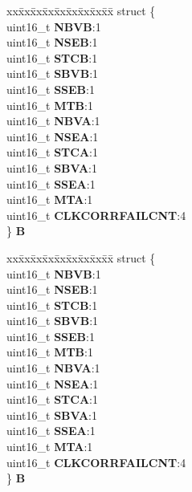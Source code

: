 \begin{DoxyCompactItemize}
\begin{tabbing}
\end{tabbing}\item 
\mbox{\label{unionuPSR2_adf903220107e8ba7a5a6f409ef2f9567}} 
\begin{tabbing}
xx\=xx\=xx\=xx\=xx\=xx\=xx\=xx\=xx\=\kill
struct \{\\
\>uint16\_t {\bfseries NBVB}:1\\
\>uint16\_t {\bfseries NSEB}:1\\
\>uint16\_t {\bfseries STCB}:1\\
\>uint16\_t {\bfseries SBVB}:1\\
\>uint16\_t {\bfseries SSEB}:1\\
\>uint16\_t {\bfseries MTB}:1\\
\>uint16\_t {\bfseries NBVA}:1\\
\>uint16\_t {\bfseries NSEA}:1\\
\>uint16\_t {\bfseries STCA}:1\\
\>uint16\_t {\bfseries SBVA}:1\\
\>uint16\_t {\bfseries SSEA}:1\\
\>uint16\_t {\bfseries MTA}:1\\
\>uint16\_t {\bfseries CLKCORRFAILCNT}:4\\
\} {\bfseries B}\\

\end{tabbing}\item 
\mbox{\label{unionuPSR2_ac6981100156e49c1d8a88047612e6931}} 
\begin{tabbing}
xx\=xx\=xx\=xx\=xx\=xx\=xx\=xx\=xx\=\kill
struct \{\\
\>uint16\_t {\bfseries NBVB}:1\\
\>uint16\_t {\bfseries NSEB}:1\\
\>uint16\_t {\bfseries STCB}:1\\
\>uint16\_t {\bfseries SBVB}:1\\
\>uint16\_t {\bfseries SSEB}:1\\
\>uint16\_t {\bfseries MTB}:1\\
\>uint16\_t {\bfseries NBVA}:1\\
\>uint16\_t {\bfseries NSEA}:1\\
\>uint16\_t {\bfseries STCA}:1\\
\>uint16\_t {\bfseries SBVA}:1\\
\>uint16\_t {\bfseries SSEA}:1\\
\>uint16\_t {\bfseries MTA}:1\\
\>uint16\_t {\bfseries CLKCORRFAILCNT}:4\\
\} {\bfseries B}\\


\end{tabbing}
\end{DoxyCompactItemize}
